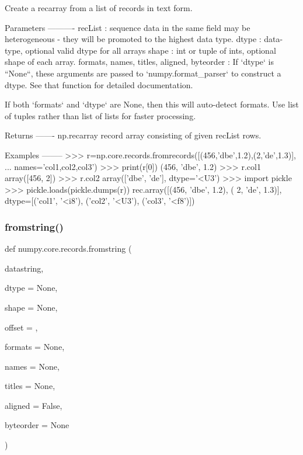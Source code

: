 \begin{DoxyVerb}Create a recarray from a list of records in text form.

Parameters
----------
recList : sequence
    data in the same field may be heterogeneous - they will be promoted
    to the highest data type.
dtype : data-type, optional
    valid dtype for all arrays
shape : int or tuple of ints, optional
    shape of each array.
formats, names, titles, aligned, byteorder :
    If `dtype` is ``None``, these arguments are passed to
    `numpy.format_parser` to construct a dtype. See that function for
    detailed documentation.

    If both `formats` and `dtype` are None, then this will auto-detect
    formats. Use list of tuples rather than list of lists for faster
    processing.

Returns
-------
np.recarray
    record array consisting of given recList rows.

Examples
--------
>>> r=np.core.records.fromrecords([(456,'dbe',1.2),(2,'de',1.3)],
... names='col1,col2,col3')
>>> print(r[0])
(456, 'dbe', 1.2)
>>> r.col1
array([456,   2])
>>> r.col2
array(['dbe', 'de'], dtype='<U3')
>>> import pickle
>>> pickle.loads(pickle.dumps(r))
rec.array([(456, 'dbe', 1.2), (  2, 'de', 1.3)],
          dtype=[('col1', '<i8'), ('col2', '<U3'), ('col3', '<f8')])
\end{DoxyVerb}
 \mbox{\label{namespacenumpy_1_1core_1_1records_a00058e350d76ecfea2c90d0c564b723c}} 
\subsubsection{\texorpdfstring{fromstring()}{fromstring()}}
{\footnotesize\ttfamily def numpy.\+core.\+records.\+fromstring (\begin{DoxyParamCaption}\item[{}]{datastring,  }\item[{}]{dtype = {\ttfamily None},  }\item[{}]{shape = {\ttfamily None},  }\item[{}]{offset = {},  }\item[{}]{formats = {\ttfamily None},  }\item[{}]{names = {\ttfamily None},  }\item[{}]{titles = {\ttfamily None},  }\item[{}]{aligned = {\ttfamily False},  }\item[{}]{byteorder = {\ttfamily None} }\end{DoxyParamCaption})}

